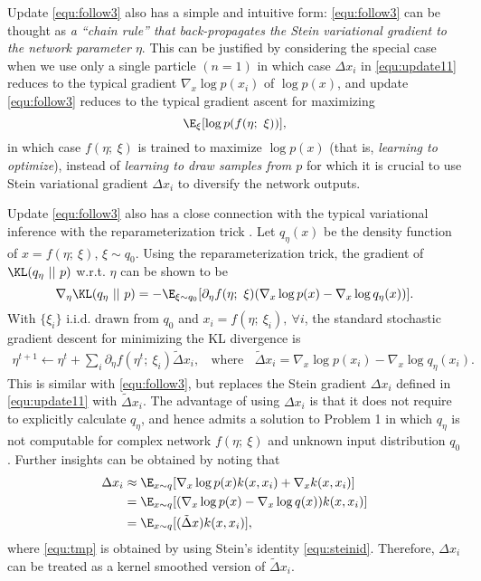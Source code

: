 \documentclass{article} \usepackage{iclr2017_conference,times}
\begin{document}
Update \eqref{equ:follow3} also has a simple and intuitive form: \eqref{equ:follow3} can be thought as \emph{a ``chain rule'' that back-propagates the Stein variational gradient to the network parameter $\eta$}. 
This can be justified by considering the special case when we use only a single particle $(n=1)$ 
in which case $\Delta x_i$ in \eqref{equ:update11} reduces to the typical gradient $\nabla_x \log p(x_i)$ of $\log p(x)$, 
and update \eqref{equ:follow3} reduces to the typical gradient ascent for maximizing 
$$\E_{\xi}[\log p(f(\eta;~\xi))],$$  
in which case $f(\eta;~\xi)$ is trained to maximize $\log p(x)$ (that is, \emph{learning to optimize}), 
instead of \emph{learning to draw samples from $p$} for which it is crucial to use Stein variational gradient $\Delta x_i$ to diversify the network outputs. 


Update \eqref{equ:follow3} also has a close connection with the typical variational inference with the reparameterization trick \citep{kingma2013auto}. Let $q_\eta(x)$ be the density function of $x = f(\eta;~\xi)$, $\xi\sim q_0$. Using the reparameterization trick, the gradient of $\KL(q_\eta~||~p)$ w.r.t. $\eta$ can be shown to be 
$$
\nabla_\eta\KL(q_{\eta}~||~p) = -\E_{\xi \sim q_0}[\partial_\eta f(\eta;~\xi)(\nabla_x \log p(x) - \nabla_x \log q_\eta(x))]. 
$$
With $\{\xi_i\}$ i.i.d. drawn from $q_0$ and $x_i = f(\eta;~\xi_i), ~\forall i$, the standard stochastic gradient descent for minimizing the KL divergence is 
\begin{align}\label{equ:rep}
\eta^{t+1} \gets \eta^t +  \sum_i \partial_\eta f(\eta^t;~\xi_i) \tilde \Delta x_i, ~~~~ \text{where} ~~~~ 
\tilde \Delta x_i = \nabla_x \log p(x_i) - \nabla_x \log q_\eta(x_i). 
\end{align}
This is similar with \eqref{equ:follow3}, but replaces the Stein gradient $\Delta x_i$ defined in \eqref{equ:update11} with 
$\tilde \Delta x_i$. The advantage of using $\Delta x_i$ is that it does not require to explicitly calculate $q_\eta$,
and hence admits a solution to Problem 1 in which $q_\eta$ is not computable for complex network $f(\eta; ~\xi)$ and unknown input distribution $q_0$. 
Further insights can be obtained by noting that 
\begin{align}
\label{equ:tmp}
\Delta x_i 
& \approx \E_{x\sim q}[\nabla_x \log p(x)k(x,x_i) + \nabla_xk(x,x_i)] \notag \\
& =  \E_{x\sim q}[(\nabla_x \log p(x) - \nabla_x \log q(x))k(x,x_i)]  \\
& = \E_{x\sim q} [( \tilde \Delta x) k(x, x_i)],  \notag
\end{align}
where \eqref{equ:tmp} is obtained by using Stein's identity \eqref{equ:steinid}. 
Therefore, $\Delta x_i$ can be treated as a kernel smoothed version of $\tilde \Delta x_i $. 
\end{document}
